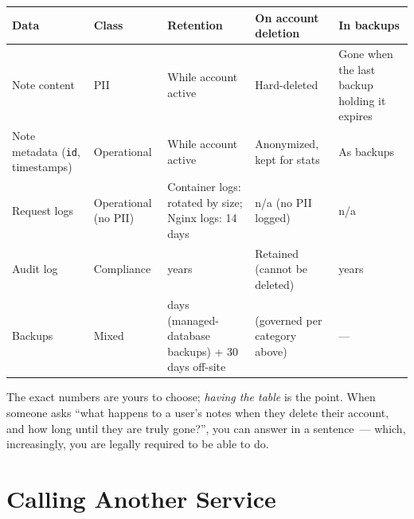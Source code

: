 {\def\LTcaptype{none} %
\begin{longtable}[]{@{}
  >{\raggedright\arraybackslash}p{}
  >{\raggedright\arraybackslash}p{}
  >{\raggedright\arraybackslash}p{}
  >{\raggedright\arraybackslash}p{}
  >{\raggedright\arraybackslash}p{}@{}}
\toprule\noalign{}
\begin{minipage}[b]{\linewidth}\raggedright
Data
\end{minipage} & \begin{minipage}[b]{\linewidth}\raggedright
Class
\end{minipage} & \begin{minipage}[b]{\linewidth}\raggedright
Retention
\end{minipage} & \begin{minipage}[b]{\linewidth}\raggedright
On account deletion
\end{minipage} & \begin{minipage}[b]{\linewidth}\raggedright
In backups
\end{minipage} \\
\midrule\noalign{}
\endhead
\bottomrule\noalign{}
\endlastfoot
Note content & PII & While account active & Hard-deleted & Gone when the last backup holding it expires \\
Note metadata (\texttt{id}, timestamps) & Operational & While account active & Anonymized, kept for stats & As backups \\
Request logs & Operational (no PII) & Container logs: rotated by size; Nginx logs: 14 days & n/a (no PII logged) & n/a \\
Audit log & Compliance & 7 years & Retained (cannot be deleted) & 7 years \\
Backups & Mixed & 7 days (managed-database backups) + 30 days off-site & (governed per category above) & --- \\
\end{longtable}
}

The exact numbers are yours to choose; \emph{having the table} is the point. When someone asks ``what happens to a user's notes when they delete their account, and how long until they are truly gone?'', you can answer in a sentence~--- which, increasingly, you are legally required to be able to do.

\setcounter{section}{4}
\section{Calling Another Service}\label{37-reliability:375-calling-another-service}

